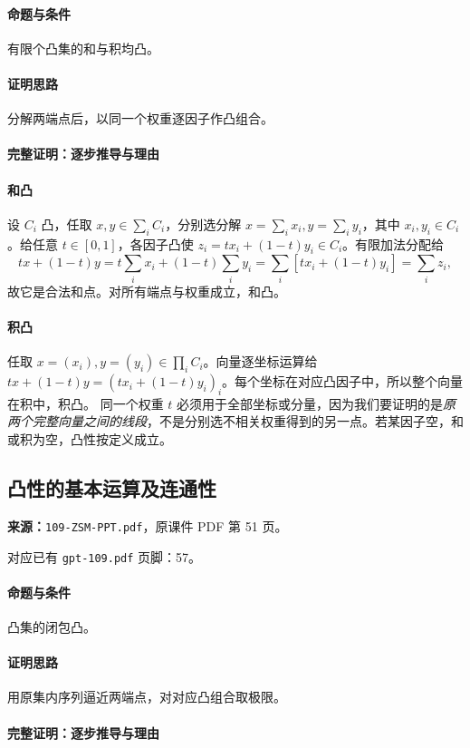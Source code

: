 \paragraph{命题与条件}有限个凸集的和与积均凸。
\paragraph{证明思路}分解两端点后，以同一个权重逐因子作凸组合。
\paragraph{完整证明：逐步推导与理由}

\paragraph{和凸}设 $C_i$ 凸，任取 $x,y\in\sum_iC_i$，分别选分解 $x=\sum_ix_i,y=\sum_iy_i$，其中 $x_i,y_i\in C_i$。给任意 $t\in[0,1]$，各因子凸使 $z_i=tx_i+(1-t)y_i\in C_i$。有限加法分配给
\[tx+(1-t)y=t\sum_ix_i+(1-t)\sum_iy_i=\sum_i[tx_i+(1-t)y_i]=\sum_iz_i,\]
故它是合法和点。对所有端点与权重成立，和凸。
\paragraph{积凸}任取 $x=(x_i),y=(y_i)\in\prod_iC_i$。向量逐坐标运算给 $tx+(1-t)y=(tx_i+(1-t)y_i)_i$。每个坐标在对应凸因子中，所以整个向量在积中，积凸。
同一个权重 $t$ 必须用于全部坐标或分量，因为我们要证明的是\emph{原两个完整向量之间的线段}，不是分别选不相关权重得到的另一点。若某因子空，和或积为空，凸性按定义成立。

\clearpage\subsection{凸性的基本运算及连通性}
\textbf{来源：}\texttt{109-ZSM-PPT.pdf}，原课件 PDF 第 51 页。\par
对应已有 \texttt{gpt-109.pdf} 页脚：57。\par
\paragraph{命题与条件}凸集的闭包凸。
\paragraph{证明思路}用原集内序列逼近两端点，对对应凸组合取极限。
\paragraph{完整证明：逐步推导与理由}

